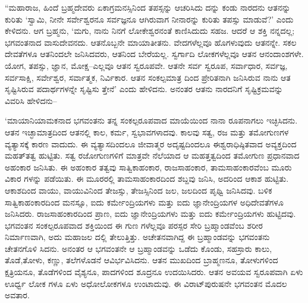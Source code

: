 “ಮಹಾರಾಜ, ಹಿಂದೆ ಬ್ರಹ್ಮದೇವರು ಏಕಾಗ್ರಮನಸ್ಸಿನಿಂದ ತಪಸ್ಸನ್ನು ಆಚರಿಸಿದು ದನ್ನು ಕಂಡು ನಾರದನು ಆತನನ್ನು ಕುರಿತು ‘ಸ್ವಾಮಿ, ನೀನೇ ಸರ್ವೇಶ್ವರನೂ ಸರ್ವಜ್ಞನೂ ಆಗಿರುವಾಗ ನೀನಾರನ್ನು ಕುರಿತು ತಪಸ್ಸು ಮಾಡುವೆ?’ ಎಂದು ಕೇಳಿದನು. ಆಗ ಬ್ರಹ್ಮನು, ‘ಮಗು, ನಾನು ನಿನಗೆ ಲೋಕೇಶ್ವರನಂತೆ ಕಾಣಿಸಿದುದು ಸಹಜ. ಆದರೆ ಆ ಶಕ್ತಿ ನನ್ನದಲ್ಲ; ಭಗವಂತನಾದ ವಾಸುದೇವನದು. ಆತನೊಬ್ಬನೇ ಮಾಯಾತೀತನು. ವೇದಗಳೆಲ್ಲವೂ ಹೊಗಳುವುದು ಆತನನ್ನೇ. ಸಕಲ ದೇವತೆಗಳೂ ಆತನಿಂದಲೇ ಜನಿಸಿದವರು, ಆತನಿಂದ ಬೇರೆಯಲ್ಲ. ಸ್ವರ್ಗಾದಿ ಲೋಕಗಳೆಲ್ಲವೂ ಆತನ ಆನಂದಾಂಶಗಳೇ. ಯೋಗ, ತಪಸ್ಸು, ಜ್ಞಾನ, ಮೋಕ್ಷ–ಎಲ್ಲವೂ ಆತನ ಸ್ವರೂಪವೇ. ಆತನೇ ಸರ್ವ ಸ್ವರೂಪ, ಸರ್ವಾಧಾರ, ಸರ್ವಜ್ಞ, ಸರ್ವಸಾಕ್ಷಿ, ಸರ್ವೇಶ್ವರ, ಸರ್ವಾತ್ಮಕ, ನಿರ್ವಿಕಾರ. ಆತನ ಸಂಕಲ್ಪಮಾತ್ರ ದಿಂದ ಪ್ರೇರಿತನಾಗಿ ಜನಿಸಿರುವ ನಾನು ಆತ ಸೃಷ್ಟಿಸಿರುವ ಪದಾರ್ಥಗಳನ್ನೇ ಸೃಷ್ಟಿಸು ತ್ತೇನೆ’ ಎಂದು ಹೇಳಿದನು. ಅನಂತರ ಆತನು ನಾರದನಿಗೆ ಸೃಷ್ಟಿಕ್ರಮವನ್ನು ವಿವರಿಸಿ ಹೇಳಿದನು–

‘ಮಾಯಾನಿಯಾಮಕನಾದ ಭಗವಂತನು ತನ್ನ ಸಂಕಲ್ಪರೂಪವಾದ ಮಾಯೆಯಿಂದ ನಾನಾ ರೂಪನಾಗಲು ಇಚ್ಛಿಸಿದನು. ಆತನ ಇಚ್ಛಾಮಾತ್ರದಿಂದ ಆತನಲ್ಲಿ ಕಾಲ, ಕರ್ಮ, ಸ್ವಭಾವಗಳಾದವು. ಕಾಲವು ಸತ್ವ, ರಜ ಮತ್ತು ತಮೋಗುಣಗಳ ವ್ಯತ್ಯಾಸಕ್ಕೆ ಕಾರಣ ವಾದುದು. ಈ ವ್ಯತ್ಯಾಸದಿಂದಲೂ ಜೀವಾತ್ಮರ ಅದೃಷ್ಟದಿಂದಲೂ ಈಶ್ವರಾಧಿಷ್ಠಿತವಾದ ಅವ್ಯಕ್ತದಿಂದ ಮಹತ್​ತತ್ವ ಹುಟ್ಟಿತು. ಸತ್ವ ರಜೋಗುಣಗಳಿಗೆ ಮಾತ್ರವೇ ನೆಲೆಯಾದ ಆ ಮಹತ್ತತ್ವದಿಂದ ತಮೋಗುಣ ಪ್ರಧಾನವಾದ ಅಹಂಕಾರ ಜನಿಸಿತು. ಈ ಅಹಂಕಾರ ತತ್ವವು ಸಾತ್ವಿಕಾಹಂಕಾರ, ರಾಜಸಾಹಂಕಾರ, ತಾಮಸಾಹಂಕಾರವೆಂಬ ಮೂರು ವಿಕಾರ ಗಳನ್ನು ಪಡೆಯಿತು. ಈ ಮೂರರಲ್ಲಿ ತಾಮಸಾಹಂಕಾರದಿಂದ ಶಬ್ದವು ಜನಿಸಿ, ಅದರಿಂದ ಆಕಾಶ ಹುಟ್ಟಿತು. ಆಕಾಶದಿಂದ ವಾಯು, ವಾಯುವಿನಿಂದ ತೇಜಸ್ಸು, ತೇಜಸ್ಸಿನಿಂದ ಜಲ, ಜಲದಿಂದ ಪೃಥ್ವಿ ಜನಿಸಿದವು. ಬಳಿಕ ಸಾತ್ವಿಕಾಹಂಕಾರದಿಂದ ಮನಸ್ಸೂ, ಐದು ಕರ್ಮೇಂದ್ರಿಯಗಳು ಮತ್ತು ಐದು ಜ್ಞಾನೇಂದ್ರಿಯಗಳ ಅಧಿದೇವತೆಗಳೂ ಜನಿಸಿದರು. ರಾಜಸಾಹಂಕಾರದಿಂದ ಪ್ರಾಣ, ಐದು ಜ್ಞಾನೇಂದ್ರಿಯಗಳು ಮತ್ತು ಐದು ಕರ್ಮೇಂದ್ರಿಯಗಳು ಹುಟ್ಟಿದವು. ಭಗವಂತನ ಸಂಕಲ್ಪರೂಪವಾದ ಶಕ್ತಿಯಿಂದ ಈ ಗುಣ ಗಳೆಲ್ಲವೂ ಪರಸ್ಪರ ಸೇರಿ ಬ್ರಹ್ಮಾಂಡವೆಂಬ ಶರೀರ ನಿರ್ಮಾಣವಾಗಿ, ಅದು ಮಹಾಜಲ ದಲ್ಲಿ ತೇಲುತ್ತಿತ್ತು. ಅಚೇತನವಾಗಿದ್ದ ಈ ಬ್ರಹ್ಮಾಂಡವನ್ನು ಭಗವಂತನು ಚೇತನಗೊಳಿ ಸಿದನು. ಅನಂತರ ಆ ಭಗವಂತನೇ ಆ ಬ್ರಹ್ಮಾಂಡವನ್ನು ಒಡೆದು ಕೊಂಡು, ಸಹಸ್ರಾರು ಕಾಲು, ತೊಡೆ,ತೋಳು, ಕಣ್ಣು, ತಲೆಗಳೊಡನೆ ಆವಿರ್ಭವಿಸಿದನು. ಆತನ ಮುಖದಿಂದ ಬ್ರಾಹ್ಮಣನೂ, ತೋಳುಗಳಿಂದ ಕ್ಷತ್ರಿಯನೂ, ತೊಡೆಗಳಿಂದ ವೈಶ್ಯನೂ, ಪಾದಗಳಿಂದ ಶೂದ್ರನೂ ಉದಯಿಸಿದರು. ಆತನ ಅವಯವ ಸ್ವರೂಪವಾಗಿ ಏಳು ಊರ್ಧ್ವ ಲೋಕ ಗಳೂ ಏಳು ಅಧೋಲೋಕಗಳೂ ಉಂಟಾದುವು. ಈ ವಿರಾಟ್​ಪುರುಷನೇ ಭಗವಂತನ ಮೊದಲ ಅವತಾರ.


